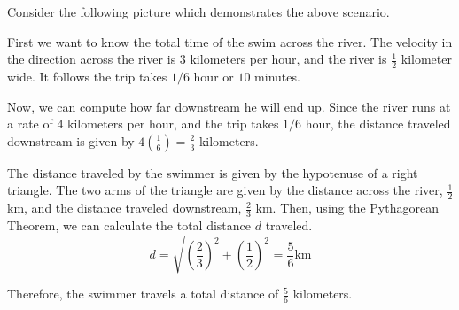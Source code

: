 \begin{solution}
Consider the following picture which demonstrates the above scenario. 

\begin{center}
\end{center}

First we want to know the total time of the swim across the river. 
The velocity in the direction across the river is
$3$ kilometers per hour, and the river is $\frac{1}{2}$ kilometer wide. It follows the trip
takes $1/6$ hour or $10$ minutes. 

Now, we can compute how far downstream he will end up. Since the river runs at a rate of 
$4$ kilometers per hour, and the trip takes $1/6$ hour, the distance traveled downstream 
is given by $4 \left(\frac{1}{6}\right) = \frac{2}{3}$ kilometers. 

The distance traveled by the swimmer is given by the hypotenuse of a right triangle. 
The two arms of the triangle are given by the distance across the river, $\frac{1}{2}$km, and 
the distance traveled downstream, $\frac{2}{3}$ km. Then, using the Pythagorean Theorem, we can calculate
the total distance $d$ traveled.
\begin{equation*}
d
=
\sqrt{ \left(\frac{2}{3} \right)^2 + \left( \frac{1}{2} \right) ^2 }
=
\frac{5}{6} \mbox{km}
\end{equation*}

Therefore, the swimmer travels a total distance of $\frac{5}{6}$ kilometers. 
\end{solution}
